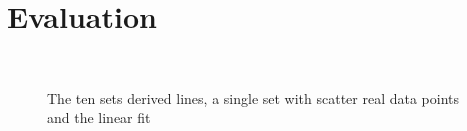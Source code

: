 \documentclass[conference]{IEEEtran}
\begin{document}
\section{Evaluation}\label{sec:evaluation}

\begin{figure}[t]
    \centering
    \\
    \caption{The ten sets derived lines, a single set with scatter real data points and the linear fit}
    \label{grph:fits}
\end{figure}
\end{document}
